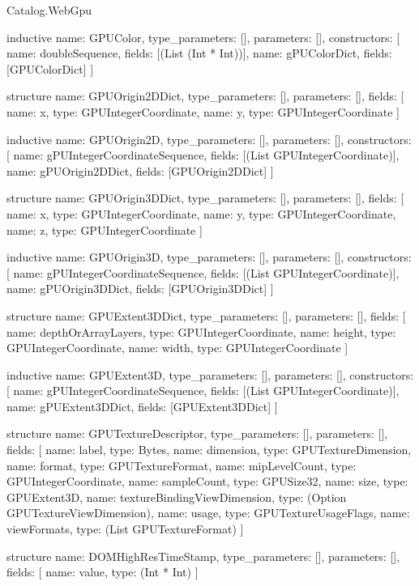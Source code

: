 \begin{lexlean}{Catalog.WebGpu}
\begin{semanticmodule}
inductive{
  name: GPUColor,
  type_parameters: [],
  parameters: [],
  constructors: [
    {name: doubleSequence, fields: [(List (Int * Int))]},
    {name: gPUColorDict, fields: [GPUColorDict]}
  ]
}

structure{
  name: GPUOrigin2DDict,
  type_parameters: [],
  parameters: [],
  fields: [
    {name: x, type: GPUIntegerCoordinate},
    {name: y, type: GPUIntegerCoordinate}
  ]
}

inductive{
  name: GPUOrigin2D,
  type_parameters: [],
  parameters: [],
  constructors: [
    {name: gPUIntegerCoordinateSequence, fields: [(List GPUIntegerCoordinate)]},
    {name: gPUOrigin2DDict, fields: [GPUOrigin2DDict]}
  ]
}

structure{
  name: GPUOrigin3DDict,
  type_parameters: [],
  parameters: [],
  fields: [
    {name: x, type: GPUIntegerCoordinate},
    {name: y, type: GPUIntegerCoordinate},
    {name: z, type: GPUIntegerCoordinate}
  ]
}

inductive{
  name: GPUOrigin3D,
  type_parameters: [],
  parameters: [],
  constructors: [
    {name: gPUIntegerCoordinateSequence, fields: [(List GPUIntegerCoordinate)]},
    {name: gPUOrigin3DDict, fields: [GPUOrigin3DDict]}
  ]
}

structure{
  name: GPUExtent3DDict,
  type_parameters: [],
  parameters: [],
  fields: [
    {name: depthOrArrayLayers, type: GPUIntegerCoordinate},
    {name: height, type: GPUIntegerCoordinate},
    {name: width, type: GPUIntegerCoordinate}
  ]
}

inductive{
  name: GPUExtent3D,
  type_parameters: [],
  parameters: [],
  constructors: [
    {name: gPUIntegerCoordinateSequence, fields: [(List GPUIntegerCoordinate)]},
    {name: gPUExtent3DDict, fields: [GPUExtent3DDict]}
  ]
}

structure{
  name: GPUTextureDescriptor,
  type_parameters: [],
  parameters: [],
  fields: [
    {name: label, type: Bytes},
    {name: dimension, type: GPUTextureDimension},
    {name: format, type: GPUTextureFormat},
    {name: mipLevelCount, type: GPUIntegerCoordinate},
    {name: sampleCount, type: GPUSize32},
    {name: size, type: GPUExtent3D},
    {name: textureBindingViewDimension, type: (Option GPUTextureViewDimension)},
    {name: usage, type: GPUTextureUsageFlags},
    {name: viewFormats, type: (List GPUTextureFormat)}
  ]
}

structure{
  name: DOMHighResTimeStamp,
  type_parameters: [],
  parameters: [],
  fields: [
    {name: value, type: (Int * Int)}
  ]
}


\end{semanticmodule}
\end{lexlean}
